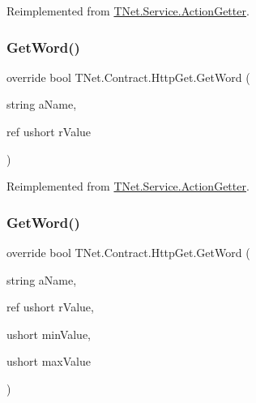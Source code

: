 Reimplemented from \mbox{\hyperlink{class_t_net_1_1_service_1_1_action_getter_a180654258e018584f5148e4e5f945105}{T\+Net.\+Service.\+Action\+Getter}}.

\mbox{\label{class_t_net_1_1_contract_1_1_http_get_a10445a4a1803e0e4f073282c9c4dd754}} 
\subsubsection{\texorpdfstring{Get\+Word()}{GetWord()}\hspace{0.1cm}{\footnotesize\ttfamily [4/5]}}
{\footnotesize\ttfamily override bool T\+Net.\+Contract.\+Http\+Get.\+Get\+Word (\begin{DoxyParamCaption}\item[{string}]{a\+Name,  }\item[{ref ushort}]{r\+Value }\end{DoxyParamCaption})\hspace{0.3cm}{\ttfamily [virtual]}}







Reimplemented from \mbox{\hyperlink{class_t_net_1_1_service_1_1_action_getter_a9709d8667c0ba20a6f1dd3e2141ea61d}{T\+Net.\+Service.\+Action\+Getter}}.

\mbox{\label{class_t_net_1_1_contract_1_1_http_get_a987ed559553d8e373939b6b97dc00dec}} 
\subsubsection{\texorpdfstring{Get\+Word()}{GetWord()}\hspace{0.1cm}{\footnotesize\ttfamily [5/5]}}
{\footnotesize\ttfamily override bool T\+Net.\+Contract.\+Http\+Get.\+Get\+Word (\begin{DoxyParamCaption}\item[{string}]{a\+Name,  }\item[{ref ushort}]{r\+Value,  }\item[{ushort}]{min\+Value,  }\item[{ushort}]{max\+Value }\end{DoxyParamCaption})\hspace{0.3cm}{\ttfamily [virtual]}}







